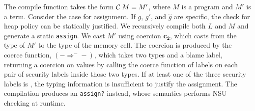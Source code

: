 The compile function takes the form $\mathcal{C}\;{M} = M'$, where $M$ is a \Surface
program and $M'$ is a \CC term. Consider the case for assignment. If $g$, $g'$,
and $\hat{g}$ are specific, the check for heap policy can be statically
justified. We recursively compile both $L$ and $M$ and generate a static
\texttt{assign}. We cast $M'$ using coercion $\bm{c_2}$, which casts from the
type of $M'$ to the type of the memory cell. The coercion is produced by the
coerce function, $({-}\Rightarrow^{-}{-})$, which takes two types and a blame
label, returning a coercion on values by calling the coerce function of labels
on each pair of security labels inside those two types. If at least one of the
three security labels is \unk, the typing information is insufficient to justify
the assignment. The compilation produces an \texttt{assign?} instead, whose
semantics performs NSU checking at runtime.
